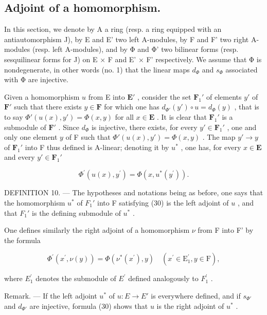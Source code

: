 \subsection{Adjoint of a homomorphism.}

In this section, we denote by A a ring (resp. a ring equipped with an antiautomorphism J), by E and E' two left A-modules, by F and F' two right A-modules (resp. left A-modules), and by Φ and Φ' two bilinear forms (resp. sesquilinear forms for J) on E × F and E' × F' respectively. We assume that Φ is nondegenerate, in other words (no. 1) that the linear maps \(d_{\Phi}\) and \(s_{\Phi}\) associated with Φ are injective.

Given a homomorphism \(u\) from E into \(\mathbf{E}'\) , consider the set \(\mathbf{F}_{1}'\) of elements \(y'\) of \(\mathbf{F}'\) such that there exists \(y \in \mathbf{F}\) for which one has \(d_{\Phi'}(y') \circ u = d_{\Phi}(y)\) , that is to say \(\Phi'(u(x), y') = \Phi(x, y)\) for all \(x \in \mathbf{E}\) . It is clear that \(\mathbf{F}_{1}'\) is a submodule of \(\mathbf{F}'\) . Since \(d_{\Phi}\) is injective, there exists, for every \(y' \in \mathbf{F}_{1}'\) , one and only one element \(y\) of F such that \(\Phi'(u(x), y') = \Phi(x, y)\) . The map \(y' \to y\) of \(\mathbf{F}_{1}'\) into F thus defined is A-linear; denoting it by \(u^{*}\) , one has, for every \(x \in \mathbf{E}\) and every \(y' \in \mathbf{F}_{1}'\)

\[
\Phi^ {\prime} (u (x), y ^ {\prime}) = \Phi (x, u ^ {*} (y ^ {\prime})).\tag{30}
\]

DEFINITION 10. --- The hypotheses and notations being as before, one says that the homomorphism \(u^*\) of \(F_1'\) into F satisfying (30) is the left adjoint of \(u\) , and that \(F_1'\) is the defining submodule of \(u^*\) .

One defines similarly the right adjoint of a homomorphism \(\nu\) from F into F' by the formula

\[
\Phi^ {\prime} (x ^ {\prime}, \nu (y)) = \Phi (\nu^ {*} (x ^ {\prime}), y) \quad (x ^ {\prime} \in \mathrm{E} _ {1} ^ {\prime}, y \in \mathrm{F}),\tag{31}
\]

where \(E_{1}^{\prime}\) denotes the submodule of \(E^{\prime}\) defined analogously to \(F_{1}^{\prime}\) .

Remark. --- If the left adjoint \(u^{*}\) of \(u: E \to E'\) is everywhere defined, and if \(s_{\Phi'}\) and \(d_{\Phi'}\) are injective, formula (30) shows that \(u\) is the right adjoint of \(u^{*}\) .

